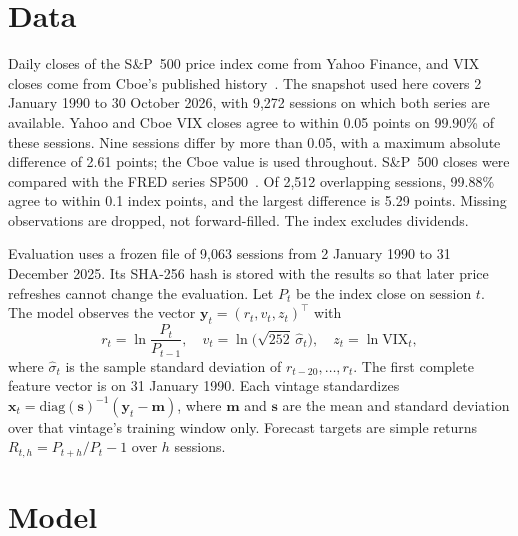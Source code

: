 \documentclass[conference]{IEEEtran}
\begin{document}
\section{Data}
\label{sec:data}
Daily closes of the S\&P~500 price index come from Yahoo Finance, and VIX closes come from Cboe's published history~\cite{cboevix}. The snapshot used here covers 2 January 1990 to 30 October 2026, with 9,272 sessions on which both series are available. Yahoo and Cboe VIX closes agree to within 0.05 points on 99.90\% of these sessions. Nine sessions differ by more than 0.05, with a maximum absolute difference of 2.61 points; the Cboe value is used throughout. S\&P~500 closes were compared with the FRED series SP500~\cite{fred}. Of 2,512 overlapping sessions, 99.88\% agree to within 0.1 index points, and the largest difference is 5.29 points. Missing observations are dropped, not forward-filled. The index excludes dividends.

Evaluation uses a frozen file of 9,063 sessions from 2 January 1990 to 31 December 2025. Its SHA-256 hash is stored with the results so that later price refreshes cannot change the evaluation. Let $P_t$ be the index close on session $t$. The model observes the vector $\mathbf{y}_t=(r_t, v_t, z_t)^\top$ with
\begin{equation}
r_t=\ln\frac{P_t}{P_{t-1}},\quad
v_t=\ln\!\big(\sqrt{252}\,\hat\sigma_t\big),\quad
z_t=\ln \mathrm{VIX}_t,
\label{eq:features}
\end{equation}
where $\hat\sigma_t$ is the sample standard deviation of $r_{t-20},\dots,r_t$. The first complete feature vector is on 31 January 1990. Each vintage standardizes $\mathbf{x}_t=\mathrm{diag}(\mathbf{s})^{-1}(\mathbf{y}_t-\mathbf{m})$, where $\mathbf{m}$ and $\mathbf{s}$ are the mean and standard deviation over that vintage's training window only. Forecast targets are simple returns $R_{t,h}=P_{t+h}/P_t-1$ over $h$ sessions.

\section{Model}
\label{sec:model}
\end{document}
